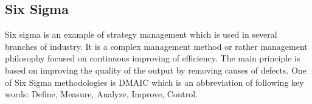 \sediva{\blindtext}

\subsection{Six Sigma}
Six sigma is an example of strategy management which is used in several branches of industry. It is a complex management method or rather management philosophy focused on continuous improving of efficiency. The main principle is based on improving the quality of the output by removing causes of defects. One of Six Sigma methodologies is DMAIC which is an abbreviation of following key words: Define, Measure, Analyze, Improve, Control.

\sediva{\blindtext}
\sediva{\blindtext}
\sediva{\blindtext}
\sediva{\blindtext}



